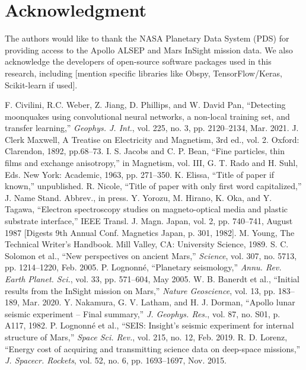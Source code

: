 \documentclass[conference]{IEEEtran}
\begin{document}
\section*{Acknowledgment}
The authors would like to thank the NASA Planetary Data System (PDS) for providing access to the Apollo ALSEP and Mars InSight mission data. We also acknowledge the developers of open-source software packages used in this research, including [mention specific libraries like Obspy, TensorFlow/Keras, Scikit-learn if used].

\begin{thebibliography}{00}
 F. Civilini, R.C. Weber, Z. Jiang, D. Phillips, and W. David Pan, ``Detecting moonquakes using convolutional neural networks, a non-local training set, and transfer learning,'' \emph{Geophys. J. Int.}, vol. 225, no. 3, pp. 2120--2134, Mar. 2021.
 J. Clerk Maxwell, A Treatise on Electricity and Magnetism, 3rd ed., vol. 2. Oxford: Clarendon, 1892, pp.68--73. 
 I. S. Jacobs and C. P. Bean, ``Fine particles, thin films and exchange anisotropy,'' in Magnetism, vol. III, G. T. Rado and H. Suhl, Eds. New York: Academic, 1963, pp. 271--350. 
 K. Elissa, ``Title of paper if known,'' unpublished. 
 R. Nicole, ``Title of paper with only first word capitalized,'' J. Name Stand. Abbrev., in press. 
 Y. Yorozu, M. Hirano, K. Oka, and Y. Tagawa, ``Electron spectroscopy studies on magneto-optical media and plastic substrate interface,'' IEEE Transl. J. Magn. Japan, vol. 2, pp. 740--741, August 1987 [Digests 9th Annual Conf. Magnetics Japan, p. 301, 1982]. 
 M. Young, The Technical Writer's Handbook. Mill Valley, CA: University Science, 1989.
 S. C. Solomon et al., ``New perspectives on ancient Mars,'' \emph{Science}, vol. 307, no. 5713, pp. 1214--1220, Feb. 2005.
 P. Lognonné, ``Planetary seismology,'' \emph{Annu. Rev. Earth Planet. Sci.}, vol. 33, pp. 571--604, May 2005.
 W. B. Banerdt et al., ``Initial results from the InSight mission on Mars,'' \emph{Nature Geoscience}, vol. 13, pp. 183--189, Mar. 2020.
 Y. Nakamura, G. V. Latham, and H. J. Dorman, ``Apollo lunar seismic experiment – Final summary,'' \emph{J. Geophys. Res.}, vol. 87, no. S01, p. A117, 1982.
 P. Lognonné et al., ``SEIS: Insight’s seismic experiment for internal structure of Mars,'' \emph{Space Sci. Rev.}, vol. 215, no. 12, Feb. 2019.
 R. D. Lorenz, ``Energy cost of acquiring and transmitting science data on deep-space missions,'' \emph{J. Spacecr. Rockets}, vol. 52, no. 6, pp. 1693--1697, Nov. 2015.

\end{thebibliography}
\end{document}
